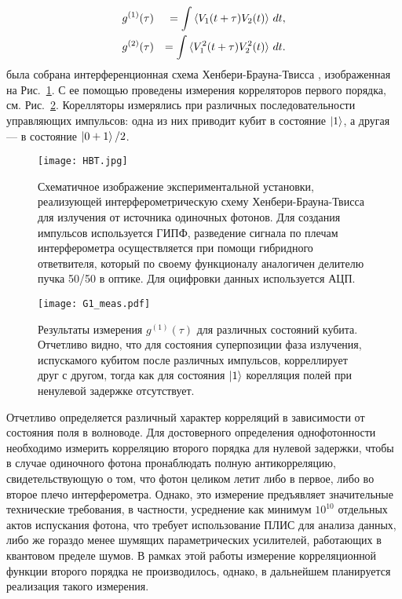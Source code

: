 \begin{eqnarray}
	&g^{(1)}(\tau) &=\int \braket{V_1(t+\tau)V_2(t)} \,dt, \\
	&g^{(2)}(\tau) &=\int \braket{V_1^2(t+\tau)V_2^2(t)} \,dt.
\end{eqnarray}
была собрана интерференционная схема Хенбери-Брауна-Твисса \cite{confbib1}, изображенная на Рис.~\ref{fig: hbt}. С ее помощью проведены измерения корреляторов первого порядка, см. Рис.~\ref{fig: g1tau}. Корелляторы измерялись при различных последовательности управляющих импульсов: одна из них приводит кубит в состояние $\ket{1}$, а другая --- в состояние $\ket{0+1}/2$. 
\begin{figure}
	\centering
	\texttt{[image: HBT.jpg]}
	\caption[Схема сборки интерферометра Хенбери-Брауна-Твисса]{Схематичное изображение экспериментальной установки, реализующей интерферометрическую схему Хенбери-Брауна-Твисса для излучения от источника одиночных фотонов. Для создания импульсов используется ГИПФ, разведение сигнала по плечам интерферометра осуществляется при помощи гибридного ответвителя, который по своему функционалу аналогичен делителю пучка 50/50 в оптике. Для оцифровки данных используется АЦП.}
	\label{fig: hbt}
\end{figure}
\begin{figure}
	\centering
	\texttt{[image: G1\_meas.pdf]}
	\caption[Результаты измерения $g^{(1)}(\tau)$]{Результаты измерения $g^{(1)}(\tau)$ для различных состояний кубита. Отчетливо видно, что для состояния суперпозиции фаза излучения, испускамого кубитом после различных импульсов, корреллирует друг с другом, тогда как для состояния $\ket{1}$ корелляция полей при ненулевой задержке отсутствует.}
	\label{fig: g1tau}
\end{figure}
Отчетливо определяется различный характер корреляций в зависимости от состояния поля в волноводе. Для достоверного определения однофотонности необходимо измерить корреляцию второго порядка для нулевой задержки, чтобы в случае одиночного фотона пронаблюдать полную антикорреляцию, свидетельствующую о том, что фотон целиком летит либо в первое, либо во второе плечо интерферометра. Однако, это измерение предъявляет значительные технические требования, в частности, усреднение как минимум $10^{10}$ отдельных актов испускания фотона, что требует использование ПЛИС для анализа данных, либо же гораздо менее шумящих параметрических усилителей, работающих в квантовом пределе шумов. В рамках этой работы измерение корреляционной функции второго порядка не производилось, однако, в дальнейшем планируется реализация такого измерения.

